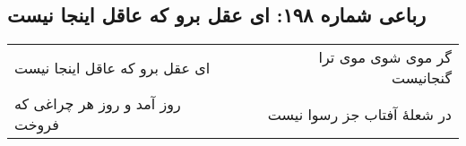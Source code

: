\begin{center}
\section*{رباعی شماره ۱۹۸: ای عقل برو که عاقل اینجا نیست}
\label{sec:0198}
\begin{longtable}{l p{0.5cm} r}
ای عقل برو که عاقل اینجا نیست
&&
گر موی شوی موی ترا گنجانیست
\\
روز آمد و روز هر چراغی که فروخت
&&
در شعلهٔ آفتاب جز رسوا نیست
\\
\end{longtable}
\end{center}

